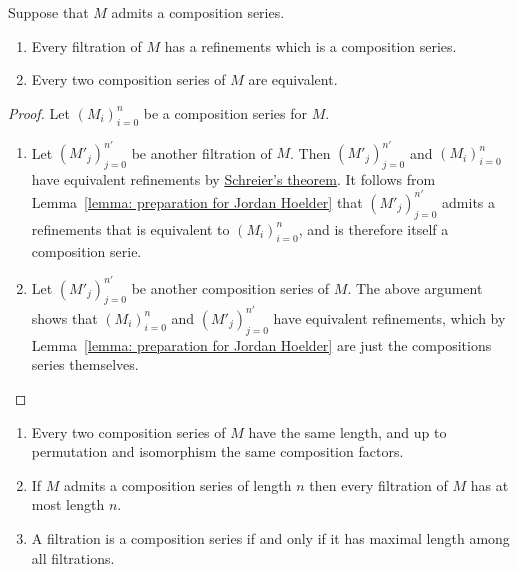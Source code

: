 \begin{theorem}
  \label{theorem: Jordan Hölder theorem}
  Suppose that $M$ admits a composition series.
  \begin{enumerate}
    \item
      Every filtration of $M$ has a refinements which is a composition series.
    \item
      Every two composition series of $M$ are equivalent.
  \end{enumerate}
\end{theorem}


\begin{proof}
  Let $(M_i)_{i=0}^n$ be a composition series for $M$.
  \begin{enumerate}
    \item
      Let $(M'_j)_{j=0}^{n'}$ be another filtration of $M$.
      Then $(M'_j)_{j=0}^{n'}$ and $(M_i)_{i=0}^n$ have equivalent refinements by \hyperref[theorem: Schreiers theorem]{Schreier’s theorem}.
      It follows from Lemma~\ref{lemma: preparation for Jordan Hoelder} that $(M'_j)_{j=0}^{n'}$ admits a refinements that is equivalent to $(M_i)_{i=0}^n$, and is therefore itself a composition serie.
    \item
      Let $(M'_j)_{j=0}^{n'}$ be another composition series of $M$.
      The above argument shows that $(M_i)_{i=0}^n$ and $(M'_j)_{j=0}^{n'}$ have equivalent refinements, which by Lemma~\ref{lemma: preparation for Jordan Hoelder} are just the compositions series themselves.
    \qedhere
  \end{enumerate}
\end{proof}


\begin{corollary}
  \label{corollary: consequences of Jordan Hoelder}
  \leavevmode
  \begin{enumerate}
    \item
      \label{enumerate: composition series have same length and factors}
      Every two composition series of $M$ have the same length, and up to permutation and isomorphism the same composition factors.
    \item
      If $M$ admits a composition series of length $n$ then every filtration of $M$ has at most length $n$.
    \item
      A filtration is a composition series if and only if it has maximal length among all filtrations.
  \end{enumerate}
\end{corollary}


